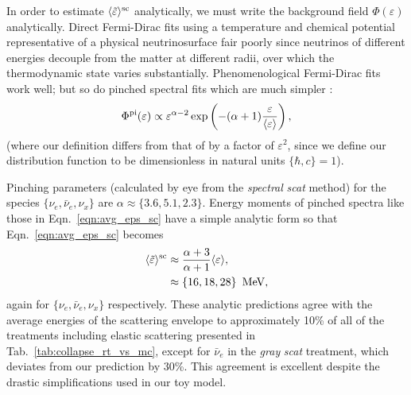 \documentclass[aps,floatfix,prd,superscriptaddress,twocolumn]{revtex4-1}
\begin{document}
In order to estimate $\langle \tilde{\varepsilon} \rangle^{\rm sc}$ analytically,
we must write the background field $\Phi(\varepsilon)$ analytically.
Direct Fermi-Dirac fits using a temperature and chemical potential
representative of a physical neutrinosurface fair poorly since neutrinos of
different energies decouple from the matter at different radii, over which
the thermodynamic state varies substantially.
Phenomenological Fermi-Dirac fits work well;
but so do pinched spectral fits which are much simpler
\cite{keil2003-pinched_spectra,miri2016-sn_neutrinos}:
\begin{equation}
  \label{eqn:pinched_spectra}
  \Phi^{\rm pi}(\varepsilon) \propto
  \varepsilon^{\alpha-2}
  \exp\left(-(\alpha+1)\frac{\varepsilon}{\langle\varepsilon\rangle}\right),
\end{equation}
(where our definition differs from that of \cite{keil2003-pinched_spectra}
by a factor of
$\varepsilon^2$, since we define our distribution function to be dimensionless
in natural units $\{\hbar,c\}=1$).

Pinching parameters
(calculated by eye from the \emph{spectral} \emph{scat} method)
for the species
$\{\nu_e,\bar{\nu}_e,\nu_x\}$ are $\alpha\approx\{3.6,5.1,2.3\}$.
Energy moments of pinched spectra like those in Eqn.~\ref{eqn:avg_eps_sc}
have a simple analytic form so that Eqn.~\ref{eqn:avg_eps_sc} becomes
\begin{align}
  \label{eqn:pinched_avg_eps_sc_1}
  \langle\tilde{\varepsilon}\rangle^{\rm sc}
  &\approx \frac{\alpha+3}{\alpha+1} \langle\varepsilon\rangle, \\
  \label{eqn:pinched_avg_eps_sc_3}
  &\approx \{16,18,28\}\,~{\rm MeV},
\end{align}
again for $\{\nu_e,\bar{\nu}_e,\nu_x\}$ respectively.
These analytic predictions agree with the average energies of the scattering
envelope to approximately 10\%
of all of the treatments including elastic scattering presented
in Tab.~\ref{tab:collapse_rt_vs_mc}, except for
$\bar{\nu}_e$ in the \emph{gray} \emph{scat} treatment,
which deviates from our prediction by 30\%.
This agreement is excellent despite the drastic
simplifications used in our toy model.
\end{document}
